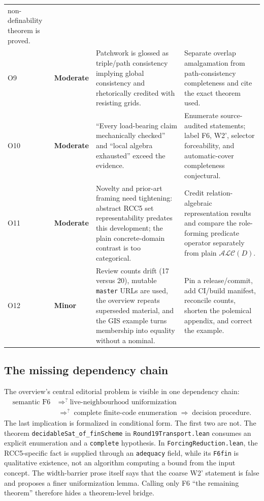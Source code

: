 \documentclass[11pt]{article}
\newcommand{\code}[1]{\texttt{#1}}
\newcommand{\sevmod}{\textcolor{amber}{\textbf{Moderate}}}
\newcommand{\sevminor}{\textcolor{slate}{\textbf{Minor}}}
\begin{document}
\begin{longtable}{L{0.055\textwidth}L{0.115\textwidth}L{0.37\textwidth}L{0.36\textwidth}}
non-definability theorem is proved. \\
O9 & \sevmod & Patchwork is glossed as triple/path consistency implying global
consistency and rhetorically credited with resisting grids. & Separate overlap
amalgamation from path-consistency completeness and cite the exact theorem used. \\
O10 & \sevmod & ``Every load-bearing claim mechanically checked'' and ``local
algebra exhausted'' exceed the evidence. & Enumerate source-audited statements; label
F6, W2', selector forceability, and automatic-cover completeness conjectural. \\
O11 & \sevmod & Novelty and prior-art framing need tightening: abstract RCC5 set
representability predates this development; the plain concrete-domain contrast is
too categorical. & Credit relation-algebraic representation results and compare
the role-forming predicate operator separately from plain \(\mathcal{ALC}(D)\). \\
O12 & \sevminor & Review counts drift (17 versus 20), mutable \code{master} URLs
are used, the overview repeats superseded material, and the GIS example turns
membership into equality without a nominal. & Pin a release/commit, add CI/build
manifest, reconcile counts, shorten the polemical appendix, and correct the example. \\
\bottomrule
\end{longtable}
\normalsize

\subsection{The missing dependency chain}

The overview's central editorial problem is visible in one dependency chain:
\[
\begin{aligned}
\boxed{\text{semantic F6}}
&\;\mathrel{\mathop{\Longrightarrow}^{?}}\;
\boxed{\text{live-neighbourhood uniformization}}\\[-1pt]
&\;\mathrel{\mathop{\Longrightarrow}^{?}}\;
\boxed{\text{complete finite-code enumeration}}
\;\Longrightarrow\;
\boxed{\text{decision procedure}}.
\end{aligned}
\]
The last implication is formalized in conditional form.  The first two are not.
The theorem \code{decidableSat\_of\_finScheme} in
\code{Round19Transport.lean} consumes an explicit enumeration and a
\code{complete} hypothesis.  In
\code{ForcingReduction.lean}, the RCC5-specific fact is supplied through an
\code{adequacy} field, while its \code{F6fin} is qualitative existence, not an
algorithm computing a bound from the input concept.  The width-barrier prose
itself says that the coarse W2' statement is false and proposes a finer
uniformization lemma.  Calling only F6 ``the remaining theorem'' therefore
hides a theorem-level bridge.
\end{document}

